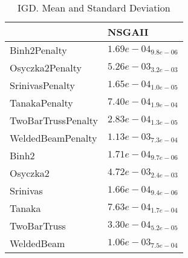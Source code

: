 \documentclass{article}
\begin{document}
\begin{table}
\caption{IGD. Mean and Standard Deviation}
\label{table: IGD}
\centering
\begin{scriptsize}
\begin{tabular}{ll}
\hline &  NSGAII\\
\hline 
Binh2Penalty & \cellcolor{gray95}$  1.69e-04_{ 9.8e-06}$ \\
Osyczka2Penalty & \cellcolor{gray95}$  5.26e-03_{ 3.2e-03}$ \\
SrinivasPenalty & \cellcolor{gray95}$  1.65e-04_{ 1.0e-05}$ \\
TanakaPenalty & \cellcolor{gray95}$  7.40e-04_{ 1.9e-04}$ \\
TwoBarTrussPenalty & \cellcolor{gray95}$  2.83e-04_{ 1.3e-05}$ \\
WeldedBeamPenalty & \cellcolor{gray95}$  1.13e-03_{ 7.3e-04}$ \\
Binh2 & \cellcolor{gray95}$  1.71e-04_{ 9.7e-06}$ \\
Osyczka2 & \cellcolor{gray95}$  4.72e-03_{ 2.4e-03}$ \\
Srinivas & \cellcolor{gray95}$  1.66e-04_{ 9.4e-06}$ \\
Tanaka & \cellcolor{gray95}$  7.63e-04_{ 1.7e-04}$ \\
TwoBarTruss & \cellcolor{gray95}$  3.30e-04_{ 5.2e-05}$ \\
WeldedBeam & \cellcolor{gray95}$  1.06e-03_{ 7.5e-04}$ \\
\hline
\end{tabular}
\end{scriptsize}
\end{table}
\end{document}
